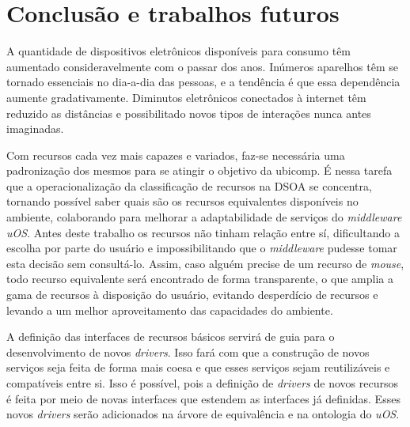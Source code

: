 \chapter{Conclusão e trabalhos futuros}

A quantidade de dispositivos eletrônicos disponíveis para consumo têm aumentado consideravelmente com o passar dos anos. Inúmeros aparelhos têm se tornado essenciais no dia-a-dia das pessoas, e a tendência é que essa dependência aumente gradativamente. Diminutos eletrônicos conectados à internet têm reduzido as distâncias e possibilitado novos tipos de interações nunca antes imaginadas.

\begin{comment}
Atualmente, utilizando um único \emph{smartphone}, é possivel acessar o seu \emph{site} preferido, consultar as ações da bolsa de valores e a previsão do tempo, mudar o canal da sua televisão, ligar a luz do seu quarto, obter rotas urbanas, dentre várias outras tarefas.

É nesse ambiente cada vez mais ubíquo que a classificação de recursos se insere: ambientes com dispositivos heterogêneos (móveis ou não) interagindo entre si, trocando informações ou utilizando capacidades características de cada aparelho.
\end{comment}

Com recursos cada vez mais capazes e variados, faz-se necessária uma padronização dos mesmos para se atingir o objetivo da ubicomp. É nessa tarefa que a operacionalização da classificação de recursos na DSOA se concentra, tornando possível saber quais são os recursos equivalentes disponíveis no ambiente, colaborando para melhorar a adaptabilidade de serviços do \emph{middleware uOS}. Antes deste trabalho os recursos não tinham relação entre sí, dificultando a escolha por parte do usuário e impossibilitando que o \emph{middleware} pudesse tomar esta decisão sem consultá-lo. Assim, caso alguém precise de um recurso de \emph{mouse}, todo recurso equivalente será encontrado de forma transparente, o que amplia a gama de recursos à disposição do usuário, evitando desperdício de recursos e levando a um melhor aproveitamento das capacidades do ambiente.

A definição das interfaces de recursos básicos servirá de guia para o desenvolvimento de novos \emph{drivers}. Isso fará com que a construção de novos serviços seja feita de forma mais coesa e que esses serviços sejam reutilizáveis e compatíveis entre si. Isso é possível, pois a definição de \emph{drivers} de novos recursos é feita por meio de novas interfaces que estendem as interfaces já definidas. Esses novos \emph{drivers} serão adicionados na árvore de equivalência e na ontologia do \emph{uOS}.

